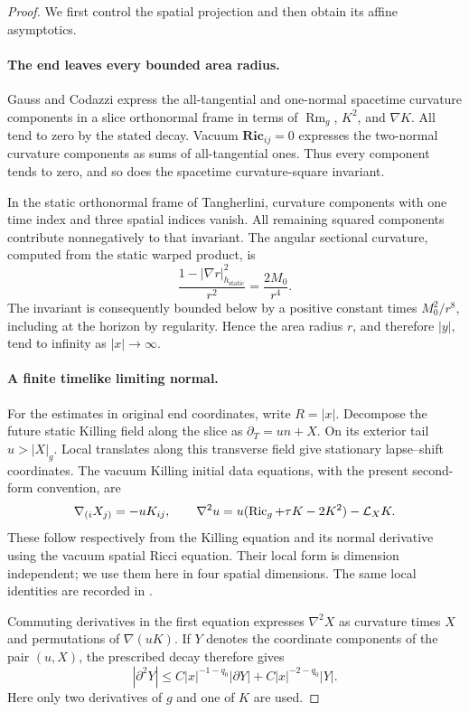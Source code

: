\begin{proof}
We first control the spatial projection and then obtain its affine asymptotics.

\paragraph{The end leaves every bounded area radius.}
Gauss and Codazzi express the all-tangential and one-normal spacetime
curvature components in a slice orthonormal frame in terms of
$\operatorname{Rm}_g$, $K^2$, and $\nabla K$.  All tend to zero by the stated
decay.  Vacuum $\mathbf{Ric}_{ij}=0$ expresses the two-normal curvature
components as sums of all-tangential ones.  Thus every component tends to
zero, and so does the spacetime curvature-square invariant.

In the static orthonormal frame of Tangherlini, curvature components with
one time index and three spatial indices vanish.  All remaining squared
components contribute nonnegatively to that invariant.  The angular
sectional curvature, computed from the static warped product, is
\[
 \frac{1-|\nabla r|_{h_{\mathrm{static}}}^2}{r^2}
 =\frac{2M_0}{r^4}.
\]
The invariant is consequently bounded below by a positive constant times
$M_0^2/r^8$, including at the horizon by regularity.  Hence the area radius
$r$, and therefore $|y|$, tend to infinity as $|x|\to\infty$.

\paragraph{A finite timelike limiting normal.}
For the estimates in original end coordinates, write $R=|x|$.
Decompose the future static Killing field along the slice as
$\partial_T=u n+X$.  On its exterior tail $u>|X|_g$.  Local translates along
this transverse field give stationary lapse--shift coordinates.  The vacuum
Killing initial data equations, with the present second-form convention, are
\begin{equation}
 \nabla_{(i}X_{j)}=-uK_{ij},\qquad
 \nabla^2u=u(\operatorname{Ric}_g+\tau K-2K^2)-\mathcal L_XK.
 \label{rig4:rec:vacuum-kid}
\end{equation}
These follow respectively from the Killing equation and its normal
derivative using the vacuum spatial Ricci equation.  Their local form is
dimension independent; we use them here in four spatial dimensions.  The
same local identities are recorded in
\cite[Section~2]{BeigChrusciel1997KID}.

Commuting derivatives in the first equation expresses $\nabla^2X$ as
curvature times $X$ and permutations of $\nabla(uK)$.  If $Y$ denotes the
coordinate components of the pair $(u,X)$, the prescribed decay therefore
gives
\begin{equation}
 |\partial^2Y|
 \leq C|x|^{-1-q_0}|\partial Y|+C|x|^{-2-q_0}|Y|.
 \label{rig4:rec:jet-estimate}
\end{equation}
Here only two derivatives of $g$ and one of $K$ are used.


\end{proof}
